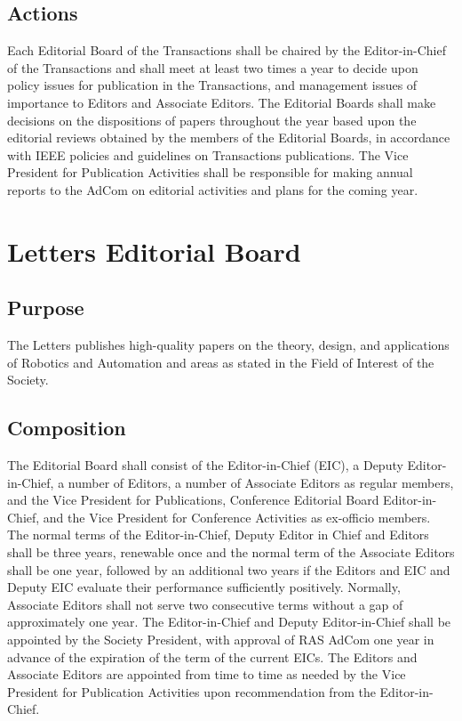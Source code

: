 \documentclass[10pt]{article}
\begin{document}
\subsection{Actions}

Each Editorial Board of the Transactions shall be chaired by the Editor-in-Chief of the Transactions and shall meet at least two times a year to decide upon policy issues for publication in the Transactions, and management issues of importance to Editors and Associate Editors.  The Editorial Boards shall make decisions on the dispositions of papers throughout the year based upon the editorial reviews obtained by the members of the Editorial Boards, in accordance with IEEE policies and guidelines on Transactions publications. The Vice President for Publication Activities shall be responsible for making annual reports to the AdCom on editorial activities and plans for the coming year. 


\section{Letters Editorial Board}
\label{LEB}

\subsection{Purpose}
The Letters publishes high-quality papers on the theory, design, and applications of Robotics and Automation and areas as stated in the Field of Interest of the Society.


\subsection{Composition}
\label{LEB:Composition}

The Editorial Board shall consist of the Editor-in-Chief (EIC), a Deputy Editor-in-Chief, a number of Editors, a number of Associate Editors as regular members, and the Vice President for Publications, Conference Editorial Board Editor-in-Chief, and the Vice President for Conference Activities as ex-officio members.  The normal terms of the Editor-in-Chief, Deputy Editor in Chief and Editors shall be three years, renewable once and the normal term of the Associate Editors shall be one year, followed by an additional two years if the Editors and EIC and Deputy EIC evaluate their performance sufficiently positively. Normally, Associate Editors shall not serve two consecutive terms without a gap of approximately one year.  The Editor-in-Chief and Deputy Editor-in-Chief shall be appointed by the Society President, with approval of RAS AdCom one year in advance of the expiration of the term of the current EICs. The Editors and Associate Editors are appointed from time to time as needed by the Vice President for Publication Activities upon recommendation from the Editor-in-Chief.
\end{document}

